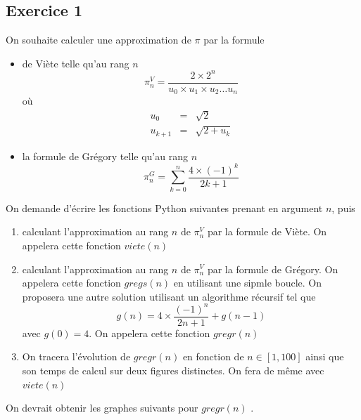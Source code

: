 \documentclass[a4paper,12pt]{article}
\begin{document}
\subsection{Exercice 1}
\begin{leftbar}
On souhaite calculer une approximation de $\pi$ par la formule 
\begin{itemize}
\item de Vi\`ete telle qu'au rang $n$
\begin{equation*}
\pi_n^V=\frac{2\times 2^n}{u_0\times u_1\times u_2\ldots u_n}
\end{equation*}
o\`u 
\begin{eqnarray*}
u_0&=&\sqrt{2}\\ \nonumber
u_{k+1}&=&\sqrt{2+u_k}
\end{eqnarray*}
\item la formule de Gr\'egory telle qu'au rang $n$
\begin{equation*}
\pi_n^G=\sum_{k=0}^n\frac{4\times(-1)^k}{2k+1}
\end{equation*}
\end{itemize}
On demande d'\'ecrire les fonctions Python suivantes prenant en argument $n$, puis 
\begin{enumerate}
\item calculant l'approximation au rang $n$ de $\pi_n^V$ par la formule de Vi\`ete. On appelera cette fonction $viete(n)$
\item  calculant l'approximation au rang $n$ de $\pi_n^V$ par la formule de Gr\'egory. On appelera cette fonction $gregs(n)$ en utilisant une sipmle boucle. On proposera une autre solution utilisant un algorithme r\'ecursif tel que 
\begin{equation*}
g(n)=4\times\frac{(-1)^n}{2n+1}+g(n-1)
\end{equation*} avec $g(0)=4$. On appelera cette fonction $gregr(n)$ 
\item On tracera l'\'evolution de $gregr(n)$ en fonction de $n\in[1,100]$ ainsi que son temps de calcul sur deux figures distinctes. On fera de m\^eme avec $viete(n)$ 
\end{enumerate}
On devrait obtenir les graphes suivants pour $gregr(n)$ . 
\end{leftbar}
\end{document}
